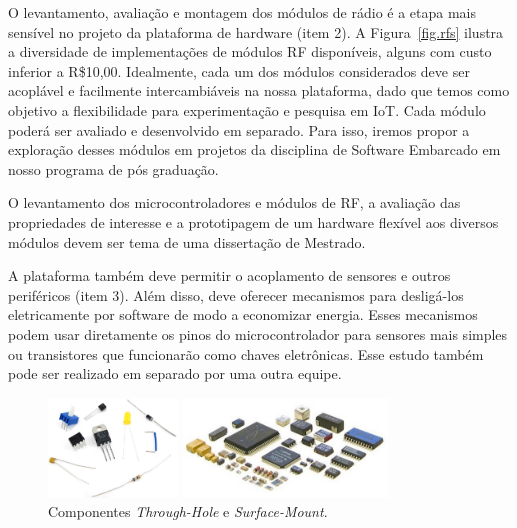 \documentclass[titlepage,12pt]{article}
\begin{document}
O levantamento, avaliação e montagem dos módulos de rádio é a etapa mais
sensível no projeto da plataforma de hardware (item 2).
%
A Figura~\ref{fig.rfs} ilustra a diversidade de implementações de módulos RF
disponíveis, alguns com custo inferior a R\$10,00.
%
Idealmente, cada um dos módulos considerados deve ser acoplável e facilmente
intercambiáveis na nossa plataforma, dado que temos como objetivo a
flexibilidade para experimentação e pesquisa em IoT.
%
Cada módulo poderá ser avaliado e desenvolvido em separado.
Para isso, iremos propor a exploração desses módulos em projetos da disciplina
de Software Embarcado em nosso programa de pós graduação.

O levantamento dos microcontroladores e módulos de RF, a avaliação das
propriedades de interesse e a prototipagem de um hardware flexível aos diversos
módulos devem ser tema de uma dissertação de Mestrado.

A plataforma também deve permitir o acoplamento de sensores e outros
periféricos (item 3).
%
Além disso, deve oferecer mecanismos para desligá-los eletricamente por
software de modo a economizar energia.
%
Esses mecanismos podem usar diretamente os pinos do microcontrolador para
sensores mais simples ou transistores que funcionarão como chaves eletrônicas.
%
Esse estudo também pode ser realizado em separado por uma outra equipe.

\begin{figure}
\begin{minipage}{0.50\textwidth}
\includegraphics[height=100px]{through-hole}
\end{minipage}
\begin{minipage}{0.50\textwidth}
\includegraphics[height=100px]{smd}
\end{minipage}
\caption{ Componentes \emph{Through-Hole} e \emph{Surface-Mount}.
    \label{fig.mount}
}
\end{figure}
\end{document}
